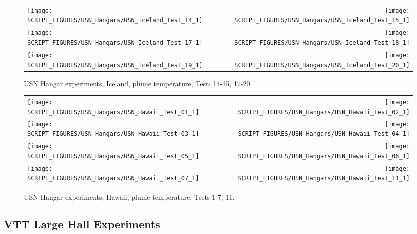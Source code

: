 \begin{figure}[p]
\begin{tabular*}{\textwidth}{l@{\extracolsep{\fill}}r}
\texttt{[image: SCRIPT\_FIGURES/USN\_Hangars/USN\_Iceland\_Test\_14\_1]} &
\texttt{[image: SCRIPT\_FIGURES/USN\_Hangars/USN\_Iceland\_Test\_15\_1]} \\
\texttt{[image: SCRIPT\_FIGURES/USN\_Hangars/USN\_Iceland\_Test\_17\_1]} &
\texttt{[image: SCRIPT\_FIGURES/USN\_Hangars/USN\_Iceland\_Test\_18\_1]} \\
\texttt{[image: SCRIPT\_FIGURES/USN\_Hangars/USN\_Iceland\_Test\_19\_1]} &
\texttt{[image: SCRIPT\_FIGURES/USN\_Hangars/USN\_Iceland\_Test\_20\_1]} \\
\end{tabular*}
\caption[USN Hangar experiments, Iceland, plume temperature, Tests 14-15, 17-20]
{USN Hangar experiments, Iceland, plume temperature, Tests 14-15, 17-20.}
\label{USN_Plume_Iceland_3}
\end{figure}

\begin{figure}[p]
\begin{tabular*}{\textwidth}{l@{\extracolsep{\fill}}r}
\texttt{[image: SCRIPT\_FIGURES/USN\_Hangars/USN\_Hawaii\_Test\_01\_1]} &
\texttt{[image: SCRIPT\_FIGURES/USN\_Hangars/USN\_Hawaii\_Test\_02\_1]} \\
\texttt{[image: SCRIPT\_FIGURES/USN\_Hangars/USN\_Hawaii\_Test\_03\_1]} &
\texttt{[image: SCRIPT\_FIGURES/USN\_Hangars/USN\_Hawaii\_Test\_04\_1]} \\
\texttt{[image: SCRIPT\_FIGURES/USN\_Hangars/USN\_Hawaii\_Test\_05\_1]} &
\texttt{[image: SCRIPT\_FIGURES/USN\_Hangars/USN\_Hawaii\_Test\_06\_1]} \\
\texttt{[image: SCRIPT\_FIGURES/USN\_Hangars/USN\_Hawaii\_Test\_07\_1]} &
\texttt{[image: SCRIPT\_FIGURES/USN\_Hangars/USN\_Hawaii\_Test\_11\_1]}
\end{tabular*}
\caption[USN Hangar experiments, Hawaii, plume temperature, Tests 1-7, 11]
{USN Hangar experiments, Hawaii, plume temperature, Tests 1-7, 11.}
\label{USN_Plume_Hawaii}
\end{figure}

\clearpage

\subsection{VTT Large Hall Experiments}
\label{VTT_Plume_Temperature}

